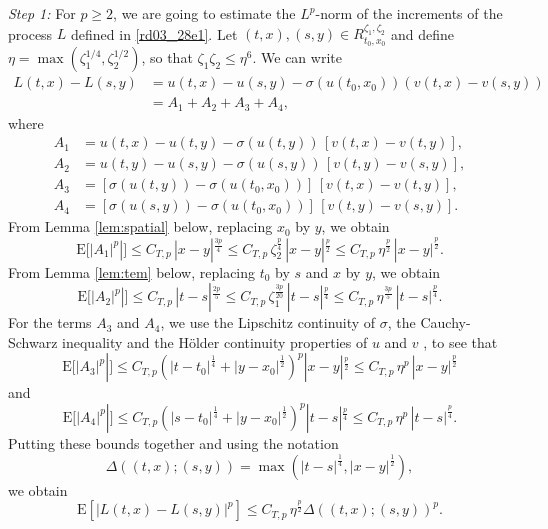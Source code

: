 \documentclass[12pt,a4paper]{article}
\newcommand{\E}{\mathrm{E}}
\newcommand{\<}{\langle}
\renewcommand{\>}{\rangle}
\begin{document}
 \noindent
 {\it Step 1:}  For $p \geq 2$, we are going to estimate the $L^p$-norm of the increments of the process $L$ defined in \eqref{rd03_28e1}. Let $(t,x), (s,y) \in R^{\zeta_1,\zeta_2}_{t_0,x_0}$ and define $\eta = \max(\zeta_1^{1/4},\zeta_2^{1/2})$, so that $\zeta_1 \zeta_2 \leq \eta^6$. We can write
 \begin{align*}
 L(t,x)-L(s,y) &= u(t,x)-u(s,y) -\sigma(u(t_0,x_0)) (v(t,x)-v(s,y))\\
     &= A_1+A_2+A_3+A_4,
 \end{align*}
 where
 \begin{align*}
 A_1 & =u(t,x)-u(t,y) -\sigma(u(t,y))\, [v(t,x)-v(t,y)], \\
  A_2&= u(t,y)-u(s,y) -\sigma(u(s,y))\, [v(t,y)-v(s,y)], \\
  A_3&= [\sigma(u(t,y)) - \sigma(u(t_0,x_0))]\, [v(t,x)-v(t,y)], \\
 A_4&= [\sigma(u(s,y)) - \sigma(u(t_0,x_0))]\, [v(t,y)-v(s,y)].
 \end{align*}
 From Lemma \ref{lem:spatial} below, replacing $x_0$ by $y$, we obtain
 \[
 \E [ |A_1|^p|] \le C_{T,p}\, |x-y|^{\frac {3p}4}  \leq C_{T,p}\, \zeta_2^{\frac p 4}\, |x-y|^{\frac {p}2} \le C_{T,p}\, \eta^{\frac p 2}\, |x-y|^{\frac p2}.
 \]
  From Lemma \ref{lem:tem} below,  replacing $t_0$ by $s$ and $x$ by $y$, we obtain 
 \[
 \E [ |A_2|^p|] \le C_{T,p}\,  |t-s|^{\frac {2p}5} \leq C_{T,p}\, \zeta_1^{\frac{3p}{20}}\, |t-s|^{\frac p4} \le C_{T,p}\, \eta^{\frac {3p}5 }\, |t-s|^{\frac p4}.
 \]
 For the terms $A_3$ and $A_4$, we use the Lipschitz continuity of $\sigma$, the Cauchy-Schwarz inequality and the H\"older continuity properties of $u$ and $v$ \cite[Proposition 4.3.2] {dss}, to see that
 \[
 \E [ |A_3|^p|] \le C_{T,p}   \left( |t-t_0|^{\frac 14}+|y-x_0|^{\frac 12}\right)^p  |x-y|^{\frac p2} \le  C_{T,p}\,  \eta^{p}\, |x-y|^{\frac p2} 
 \]
 and
  \[
 \E [ |A_4|^p|] \le C_{T,p}   \left( |s-t_0|^{\frac 14}+|y-x_0|^{\frac 12}\right)^p  |t-s|^{\frac p4} \le  C_{T,p}\,  \eta^{p}\, |t-s|^{\frac p4} .
 \]
 Putting these bounds together and using the notation 
 \begin{equation}\label{rd05_16e1}
    \Delta((t,x);(s,y))= \max\left(|t-s|^{\frac 14}, |x-y|^{\frac12}\right),
 \end{equation}
 we obtain
 \begin{equation} \label{k1}
 \E[ |L(t,x)-L(s,y)|^p] \le C_{T,p} \, \eta^{\frac{p}2} \Delta((t,x);(s,y))^{p}.
 \end{equation}
 
  \medskip
\end{document}
